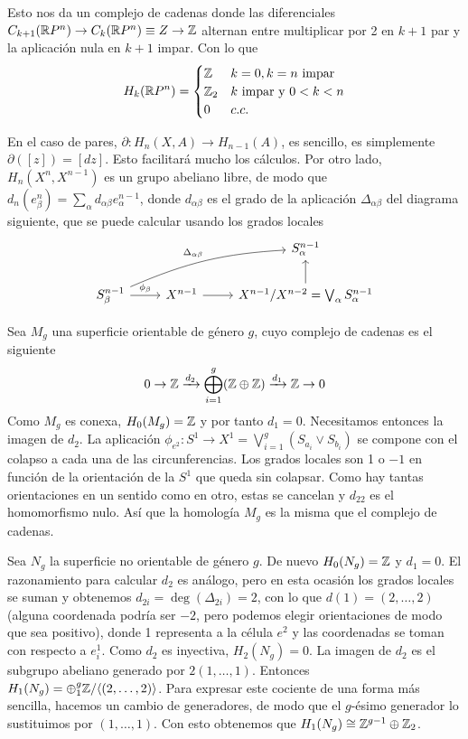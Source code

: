 \documentclass[TA.tex]{subfiles}
\begin{document}
\begin{ej}
Esto nos da un complejo de cadenas donde las diferenciales $C_{k+1}(\mathbb{R} P^n)\to C_k(\mathbb{R} P^n)\equiv Z\to\mathbb{Z}$ alternan entre multiplicar por 2 en $k+1$ par y la aplicación nula en $k+1$ impar. Con lo que
\[
H_k(\mathbb{R} P^n)=\begin{cases}
\mathbb{Z} & k=0, k=n\text{ impar}\\
\mathbb{Z}_2 & k\text{ impar y }0<k<n\\
0 & c.c.
\end{cases}
\]
\end{ej}

En el caso de pares, $\partial: H_n(X,A)\to H_{n-1}(A)$, es sencillo, es simplemente $\partial([z])=[dz]$. Esto facilitará mucho los cálculos. Por otro lado, $H_n(X^n,X^{n-1})$ es un grupo abeliano libre, de modo que $d_n(e^n_{\beta})=\sum_{\alpha}d_{\alpha\beta}e^{n-1}_{\alpha}$, donde $d_{\alpha\beta}$ es el grado de la aplicación $\Delta_{\alpha\beta}$ del diagrama siguiente, que se puede calcular usando los grados locales
\[
\begin{tikzcd}
									     &                  & S^{n-1}_{\alpha}\\
S^{n-1}_{\beta}\arrow[r, "\phi_{\beta}"]\arrow[urr, bend left=10, "\Delta_{\alpha\beta}"] & X^{n-1}\arrow[r] & X^{n-1}/X^{n-2}=\bigvee_\alpha S^{n-1}_{\alpha}\arrow[u]
\end{tikzcd}
\]
\begin{ej}
Sea $M_g$ una superficie orientable de género $g$, cuyo complejo de cadenas es el siguiente
\[
0\to \mathbb{Z}\xrightarrow{d_2}\bigoplus_{i=1}^g(\mathbb{Z}\oplus\mathbb{Z})\xrightarrow{d_1}\mathbb{Z}\to 0
\]
Como $M_g$ es conexa, $H_0(M_g)=\mathbb{Z}$ y por tanto $d_1=0$. Necesitamos entonces la imagen de $d_2$. La aplicación $\phi_{e^2}:S^1\to X^1=\bigvee_{i=1}^g(S_{a_i}\vee S_{b_i})$ se compone con el colapso a cada una de las circunferencias. Los grados locales son 1 o $-1$ en función de la orientación de la $S ^1$ que queda sin colapsar. Como hay tantas orientaciones en un sentido como en otro, estas se cancelan y $d_22$ es el homomorfismo nulo. Así que la homología $M_g$ es la misma que el complejo de cadenas.
\end{ej}

\begin{ej}
Sea $N_g$ la superficie no orientable de género $g$. De nuevo $H_0(N_g)=\mathbb{Z}$ y $d_1=0$. El razonamiento para calcular $d_2$ es análogo, pero en esta ocasión los grados locales se suman y obtenemos $d_{2i}=\deg(\Delta_{2i})=2$, con lo que $d(1)=(2,\dots, 2)$ (alguna coordenada podría ser $-2$, pero podemos elegir orientaciones de modo que sea positivo), donde 1 representa a la célula $e^2$ y las coordenadas se toman con respecto a $e_i^1$. Como $d_2$ es inyectiva, $H_2(N_g)=0$. La imagen de $d_2$ es el subgrupo abeliano generado por $2(1,\dots, 1)$. Entonces $H_1(N_g)=\oplus_{1}^g\mathbb{Z}/\langle{(2,\dots, 2)}\rangle$. Para expresar este cociente de una forma más sencilla, hacemos un cambio de generadores, de modo que el $g$-ésimo generador lo sustituimos por $(1,\dots, 1)$. Con esto obtenemos que $H_1(N_g)\cong \mathbb{Z}^{g-1}\oplus\mathbb{Z}_2$.
\end{ej}
\end{document}
